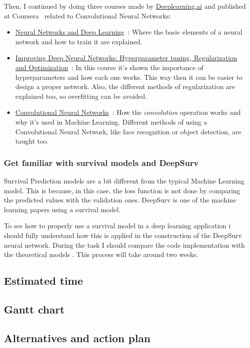 Then, I continued by doing three courses made by \href{https://www.deeplearning.ai}{Deeplearning.ai}
and published at Coursera~\cite{Coursera} related to Convolutional Neural Networks:
\begin{itemize}
    \item \href{https://www.coursera.org/learn/neural-networks-deep-learning}{Neural Networks and 
        Deep Learning}~\cite{Coursera:NN}: Where the basic elements of a neural network and how
        to train it are explained.

    \item \href{https://www.coursera.org/learn/deep-neural-network}{Improving Deep Neural Networks: 
        Hyperparameter tuning, Regularization and Optimization}~\cite{Coursera:NNHyperparameters}: 
        In this course it's shown the importance of hyperparameters and how each one works. 
        This way then it can be easier to design a proper network. Also, the different methods 
        of regularization are explained too, so overfitting can be avoided.

    \item \href{https://www.coursera.org/learn/convolutional-neural-networks}{Convolutional Neural 
        Networks}~\cite{Coursera:CNN}:
        How the \emph{convolution} operation works and why it's used in Machine Learning. 
        Different methods of using a Convolutional Neural Network, like face recognition or 
        object detection, are taught too.
\end{itemize}

\subsubsection{Get familiar with survival models and DeepSurv}

Survival Prediction models are a bit different from the typical Machine Learning model. This is
because, in this case, the loss function is not done by comparing the predicted values with 
the validation ones. DeepSurv is one of the machine learning papers using a survival model.

To see how to properly use a survival model in a deep learning application i should fully 
understand how this is applied in the construction of the DeepSurv neural network. During the task
I should compare the code implementation with the theoretical models
\cites{Cox}{DeepSurv}.
This process will take around two weeks.

\subsection{Estimated time}

\subsection{Gantt chart}

\subsection{Alternatives and action plan}
